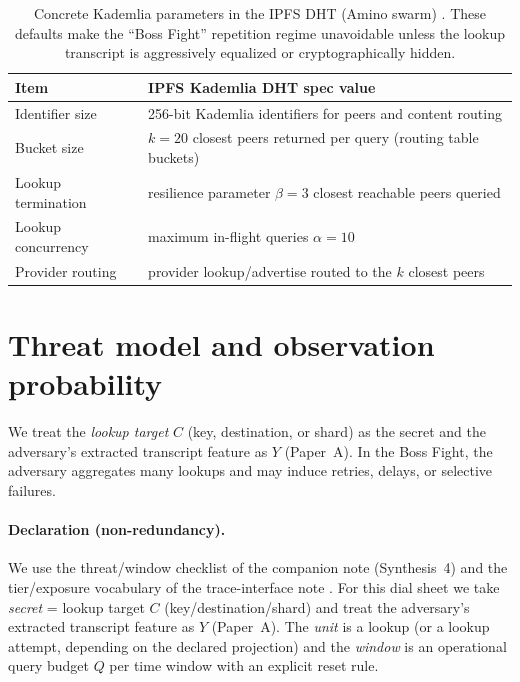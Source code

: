 \documentclass[11pt]{article}
\begin{document}
\begin{table}[t]
\centering
\caption{Concrete Kademlia parameters in the IPFS DHT (Amino swarm) \cite{ipfs_kad_spec}. These defaults make the ``Boss Fight'' repetition regime unavoidable unless the lookup transcript is aggressively equalized or cryptographically hidden.}
\label{tab:ipfs-kad-params}
\begin{tabular}{@{}ll@{}}
\toprule
Item & IPFS Kademlia DHT spec value \\ \midrule
Identifier size & 256-bit Kademlia identifiers for peers and content routing \\
Bucket size & $k=20$ closest peers returned per query (routing table buckets) \\
Lookup termination & resilience parameter $\beta=3$ closest reachable peers queried \\
Lookup concurrency & maximum in-flight queries $\alpha=10$ \\
Provider routing & provider lookup/advertise routed to the $k$ closest peers \\ \bottomrule
\end{tabular}
\end{table}





\section{Threat model and observation probability}\label{sec:pobs}
We treat the \emph{lookup target} $C$ (key, destination, or shard) as the secret and the adversary's extracted transcript feature as $Y$ (Paper~A).
In the Boss Fight, the adversary aggregates many lookups and may induce retries, delays, or selective failures.

\paragraph{Declaration (non-redundancy).}
We use the threat/window checklist of the companion note (Synthesis~4) \cite{series:threatwindows} and the tier/exposure vocabulary of the trace-interface note \cite{series:traceifaces}.
For this dial sheet we take \emph{secret} = lookup target $C$ (key/destination/shard) and treat the adversary's extracted transcript feature as $Y$ (Paper~A).
The \emph{unit} is a lookup (or a lookup attempt, depending on the declared projection) and the \emph{window} is an operational query budget $Q$ per time window with an explicit reset rule.
\end{document}
